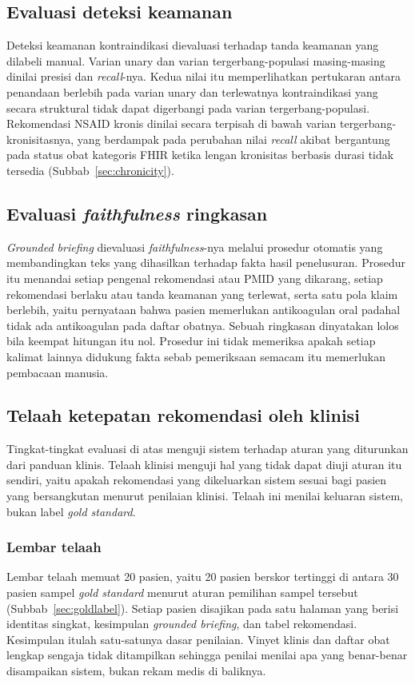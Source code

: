 \subsection{Evaluasi deteksi keamanan}
Deteksi keamanan kontraindikasi dievaluasi terhadap tanda keamanan yang dilabeli manual.
Varian unary dan varian tergerbang-populasi masing-masing dinilai presisi dan
\emph{recall}-nya. Kedua nilai itu memperlihatkan pertukaran antara penandaan berlebih pada
varian unary dan terlewatnya kontraindikasi yang secara struktural tidak dapat digerbangi
pada varian tergerbang-populasi. Rekomendasi NSAID kronis dinilai secara terpisah di bawah varian
tergerbang-kronisitasnya, yang berdampak pada perubahan nilai \emph{recall} akibat bergantung pada status obat
kategoris FHIR ketika lengan kronisitas berbasis durasi tidak tersedia
(Subbab~\ref{sec:chronicity}).

\subsection{Evaluasi \emph{faithfulness} ringkasan}
\emph{Grounded briefing} dievaluasi \emph{faithfulness}-nya melalui prosedur otomatis yang
membandingkan teks yang dihasilkan terhadap fakta hasil penelusuran. Prosedur itu menandai
setiap pengenal rekomendasi atau PMID yang dikarang, setiap rekomendasi berlaku atau tanda
keamanan yang terlewat, serta satu pola klaim berlebih, yaitu pernyataan bahwa pasien
memerlukan antikoagulan oral padahal tidak ada antikoagulan pada daftar obatnya. Sebuah
ringkasan dinyatakan lolos bila keempat hitungan itu nol. Prosedur ini tidak memeriksa apakah
setiap kalimat lainnya didukung fakta sebab pemeriksaan semacam itu memerlukan pembacaan
manusia.

\subsection{Telaah ketepatan rekomendasi oleh klinisi}
\label{sec:clinician-method}
Tingkat-tingkat evaluasi di atas menguji sistem terhadap aturan yang diturunkan dari panduan
klinis. Telaah klinisi menguji hal yang tidak dapat diuji aturan itu sendiri, yaitu apakah
rekomendasi yang dikeluarkan sistem sesuai bagi pasien yang bersangkutan menurut penilaian
klinisi. Telaah ini menilai keluaran sistem, bukan label \emph{gold standard}.

\subsubsection*{Lembar telaah}
Lembar telaah memuat 20 pasien, yaitu 20 pasien berskor tertinggi di antara 30 pasien sampel
\emph{gold standard} menurut aturan pemilihan sampel tersebut (Subbab~\ref{sec:goldlabel}).
Setiap pasien disajikan pada satu halaman yang berisi identitas singkat, kesimpulan
\emph{grounded briefing}, dan tabel rekomendasi. Kesimpulan itulah satu-satunya dasar
penilaian. Vinyet klinis dan daftar obat lengkap sengaja tidak ditampilkan sehingga penilai
menilai apa yang benar-benar disampaikan sistem, bukan rekam medis di baliknya.

